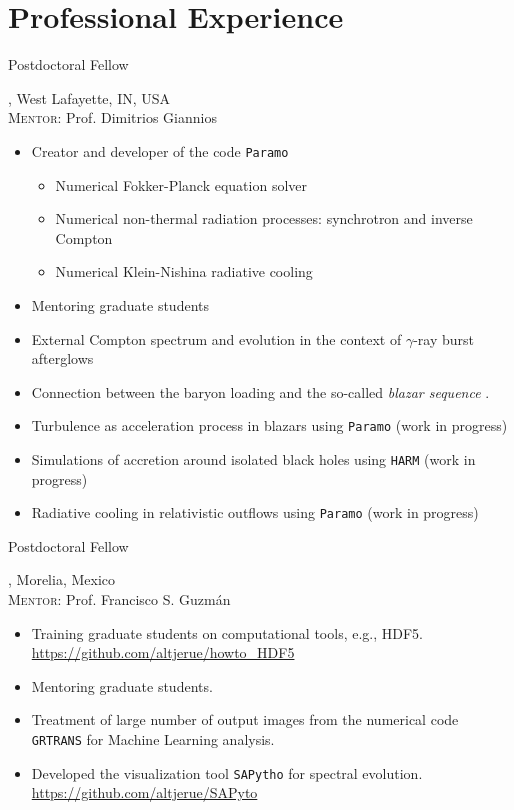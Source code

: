 \section{Professional Experience}

%
{\DPA}{Postdoctoral Fellow}%
{}%
{}%
{\Purdue, West Lafayette, IN, USA\\%
  \textsc{Mentor}: Prof. Dimitrios Giannios
  \begin{itemize}
    \item Creator and developer of the code \texttt{Paramo}
    \begin{itemize}
      \item Numerical Fokker-Planck equation solver
      \item Numerical non-thermal radiation processes: synchrotron and inverse Compton
      \item Numerical Klein-Nishina radiative cooling
    \end{itemize}
    \item Mentoring graduate students
    \item External Compton spectrum and evolution in the context of $\gamma$-ray burst afterglows \cite{Zhang:2020ch}
    \item Connection between the baryon loading and the so-called \emph{blazar sequence} \cite{RuedaBecerril:2020ha}.
    \item Turbulence as acceleration process in blazars using \texttt{Paramo} (work in progress)
    \item Simulations of accretion around isolated black holes using \texttt{HARM} (work in progress)
    \item Radiative cooling in relativistic outflows using \texttt{Paramo} (work in progress)
  \end{itemize}
}
%
{\IFMes}{Postdoctoral Fellow}%
{}%
{}%
{\UMSNHes, Morelia, Mexico\\%
  \textsc{Mentor}: Prof. Francisco S. Guzmán
  \begin{itemize}
    \item Training graduate students on computational tools, e.g., HDF5. \url{https://github.com/altjerue/howto_HDF5}
    \item Mentoring graduate students.
    \item Treatment of large number of output images from the numerical code \texttt{GRTRANS} for Machine Learning analysis.
    \item Developed the visualization tool \texttt{SAPytho} for spectral evolution. \url{https://github.com/altjerue/SAPyto}
  \end{itemize}
}
